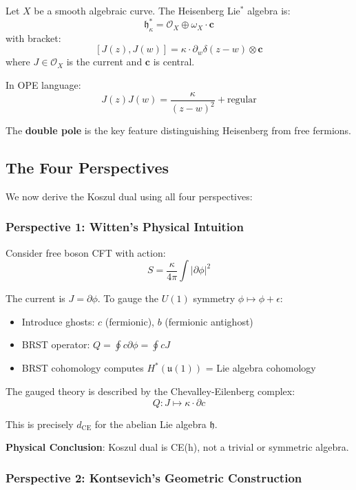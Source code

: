 \begin{example}
\begin{definition}
Let $X$ be a smooth algebraic curve. The Heisenberg Lie$^*$ algebra is:
$$\mathfrak{h}_\kappa^* = \mathcal{O}_X \oplus \omega_X \cdot \mathbf{c}$$
with bracket:
$$[J(z), J(w)] = \kappa \cdot \partial_w \delta(z-w) \otimes \mathbf{c}$$
where $J \in \mathcal{O}_X$ is the current and $\mathbf{c}$ is central.
\end{definition}

In OPE language:
$$J(z)J(w) = \frac{\kappa}{(z-w)^2} + \text{regular}$$

The \textbf{double pole} is the key feature distinguishing Heisenberg from free fermions.

\subsection{The Four Perspectives}

We now derive the Koszul dual using all four perspectives:

\subsubsection{Perspective 1: Witten's Physical Intuition}

Consider free boson CFT with action:
$$S = \frac{\kappa}{4\pi} \int |\partial \phi|^2$$

The current is $J = \partial\phi$. To gauge the $U(1)$ symmetry $\phi \mapsto \phi + \epsilon$:
\begin{itemize}
\item Introduce ghosts: $c$ (fermionic), $b$ (fermionic antighost)
\item BRST operator: $Q = \oint c \partial\phi = \oint cJ$
\item BRST cohomology computes $H^*(\mathfrak{u}(1))$ = Lie algebra cohomology
\end{itemize}

The gauged theory is described by the Chevalley-Eilenberg complex:
$$Q: J \mapsto \kappa \cdot \partial c$$

This is precisely $d_{\text{CE}}$ for the abelian Lie algebra $\mathfrak{h}$.

\textbf{Physical Conclusion}: Koszul dual is CE(h), not a trivial or symmetric algebra.

\subsubsection{Perspective 2: Kontsevich's Geometric Construction}


\end{example}
